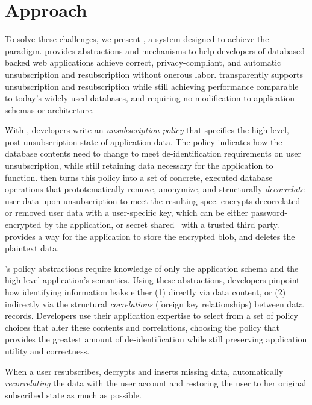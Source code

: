 \section{Approach}
To solve these challenges, we present \sys, a system designed to achieve the \name paradigm.
\sys provides abstractions and mechanisms to help developers of databased-backed web applications
achieve correct, privacy-compliant, and automatic unsubscription and resubscription without onerous
labor.
\sys transparently supports unsubscription and resubscription while still achieving performance
comparable to today’s widely-used databases, and requiring no modification to application schemas or
architecture.

With \sys, developers write an \emph{unsubscription policy} that specifies the high-level,
post-unsubscription state of application data.  The policy indicates how the database contents need
to change to meet de-identification requirements on user unsubscription, while still retaining data
necessary for the application to function. \sys then turns this policy into a set of concrete,
executed database operations that prototematically remove, anonymize, and structurally
\emph{decorrelate} user data upon unsubscription to meet the resulting spec. \sys 
encrypts decorrelated or removed user data with a user-specific key, which can be either
password-encrypted by the application, or secret shared~\cite{secretsharing} with a trusted third
party. \sys provides a way for the application to store the encrypted blob, and deletes the plaintext
data.

\sys's policy abstractions require knowledge of only the application schema and the high-level
application's semantics. Using these abstractions, developers pinpoint how identifying information
leaks either (1) directly via data content, or (2) indirectly via the structural \emph{correlations}
(foreign key relationships) between data records. Developers use their application expertise to
select from a set of policy choices that alter these contents and correlations, choosing the policy
that provides the greatest amount of de-identification while still preserving application
utility and correctness.

When a user resubscribes, \sys decrypts and inserts missing data, automatically
\emph{recorrelating} the data with the user account and restoring the user to her
original subscribed state as much as possible.


